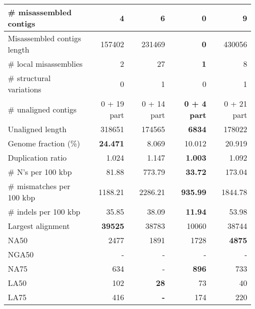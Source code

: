 \documentclass[12pt,a4paper]{article}
\begin{document}
\begin{table}[ht]
\begin{center}
\begin{tabular}{|l*{4}{|r}|}
\# misassembled contigs & 4 & 6 & {\bf 0} & 9 \\ \hline
Misassembled contigs length & 157402 & 231469 & {\bf 0} & 430056 \\ \hline
\# local misassemblies & 2 & 27 & {\bf 1} & 8 \\ \hline
\# structural variations & 0 & 1 & 0 & 1 \\ \hline
\# unaligned contigs & 0 + 19 part & 0 + 14 part & {\bf 0 + 4 part} & 0 + 21 part \\ \hline
Unaligned length & 318651 & 174565 & {\bf 6834} & 178022 \\ \hline
Genome fraction (\%) & {\bf 24.471} & 8.069 & 10.012 & 20.919 \\ \hline
Duplication ratio & 1.024 & 1.147 & {\bf 1.003} & 1.092 \\ \hline
\# N's per 100 kbp & 81.88 & 773.79 & {\bf 33.72} & 173.04 \\ \hline
\# mismatches per 100 kbp & 1188.21 & 2286.21 & {\bf 935.99} & 1844.78 \\ \hline
\# indels per 100 kbp & 35.85 & 38.09 & {\bf 11.94} & 53.98 \\ \hline
Largest alignment & {\bf 39525} & 38783 & 10060 & 38744 \\ \hline
NA50 & 2477 & 1891 & 1728 & {\bf 4875} \\ \hline
NGA50 & - & - & - & - \\ \hline
NA75 & 634 & - & {\bf 896} & 733 \\ \hline
LA50 & 102 & {\bf 28} & 73 & 40 \\ \hline
LA75 & 416 & {\bf -} & 174 & 220 \\ \hline
\end{tabular}
\end{center}
\end{table}
\end{document}
